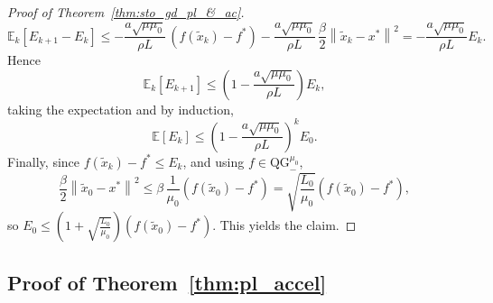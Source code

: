 \documentclass{article}
\newcommand{\bpar}[1]{\left(#1\right)}
\newcommand{\E}[1]{\mathbb{E}\left[#1 \right]}
\newcommand{\condE}[1]{\mathbb{E}_{k}\left[#1 \right]}
\newcommand{\norm}[1]{\left\lVert#1\right\rVert}
\newcommand{\qginff}[1]{\text{QG}_{-}^{#1}}
\theoremstyle{plain}
\theoremstyle{definition}
\theoremstyle{remark}
\begin{document}
\begin{proof}[Proof of Theorem~\ref{thm:sto_gd_pl_&_ac}]
\[
\condE{E_{k+1}-E_k}
\le -\frac{a\sqrt{\mu\mu_0}}{\rho L}\,(f(\tilde x_k)-f^\ast)
-\frac{a\sqrt{\mu\mu_0}}{\rho L}\,\frac{\beta}{2}\norm{\tilde x_k-x^\ast}^2
= -\frac{a\sqrt{\mu\mu_0}}{\rho L}E_k.
\]
Hence
\[
\condE{E_{k+1}}\le \bpar{1-\frac{a\sqrt{\mu\mu_0}}{\rho L}}E_k,
\]
taking the expectation and by induction,
\[
\E{E_k}\le \bpar{1-\frac{a\sqrt{\mu\mu_0}}{\rho L}}^k E_0.
\]
Finally, since $f(\tilde x_k)-f^\ast\le E_k$, and using $f\in\qginff{\mu_0}$,
\[
\frac{\beta}{2}\norm{\tilde x_0-x^\ast}^2
\le \beta\,\frac{1}{\mu_0}(f(\tilde x_0)-f^\ast)
= \sqrt{\frac{L_0}{\mu_0}}(f(\tilde x_0)-f^\ast),
\]
so $E_0\le \bpar{1+\sqrt{\frac{L_0}{\mu_0}}}(f(\tilde x_0)-f^\ast)$. This yields the claim.
\end{proof}

\subsection{Proof of Theorem~\ref{thm:pl_accel}}\label{app:pl_accel}
\end{document}
